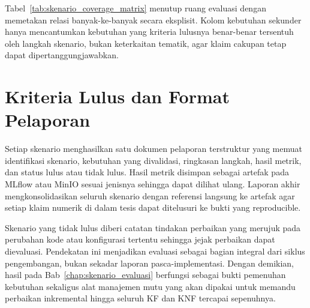 

\vspace{-0.5cm}



\vspace{-0.5cm}

Tabel~\ref{tab:skenario_coverage_matrix} menutup ruang evaluasi dengan memetakan relasi banyak-ke-banyak secara eksplisit. Kolom kebutuhan sekunder hanya mencantumkan kebutuhan yang kriteria lulusnya benar-benar tersentuh oleh langkah skenario, bukan keterkaitan tematik, agar klaim cakupan tetap dapat dipertanggungjawabkan.



\vspace{-0.5cm}

\section{Kriteria Lulus dan Format Pelaporan}

Setiap skenario menghasilkan satu dokumen pelaporan terstruktur yang memuat identifikasi skenario, kebutuhan yang divalidasi, ringkasan langkah, hasil metrik, dan status lulus atau tidak lulus. Hasil metrik disimpan sebagai artefak pada MLflow atau MinIO sesuai jenisnya sehingga dapat dilihat ulang. Laporan akhir mengkonsolidasikan seluruh skenario dengan referensi langsung ke artefak agar setiap klaim numerik di dalam tesis dapat ditelusuri ke bukti yang reproducible.

Skenario yang tidak lulus diberi catatan tindakan perbaikan yang merujuk pada perubahan kode atau konfigurasi tertentu sehingga jejak perbaikan dapat dievaluasi. Pendekatan ini menjadikan evaluasi sebagai bagian integral dari siklus pengembangan, bukan sekadar laporan pasca-implementasi. Dengan demikian, hasil pada Bab~\ref{chap:skenario_evaluasi} berfungsi sebagai bukti pemenuhan kebutuhan sekaligus alat manajemen mutu yang akan dipakai untuk memandu perbaikan inkremental hingga seluruh KF dan KNF tercapai sepenuhnya.

